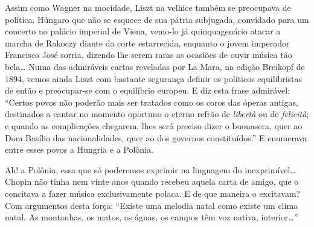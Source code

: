 Assim como Wagner na mocidade, Liszt na velhice também se preocupava de
política. Húngaro que não se esquece de sua pátria subjugada, convidado
para um concerto no palácio imperial de Viena, vemo-lo já quinquagenário
atacar a marcha de Rakoczy diante da corte estarrecida, enquanto o jovem
imperador Francisco José sorria, dizendo lhe serem raras as ocasiões de
ouvir música tão bela\ldots{} Numa das admiráveis cartas reveladas por La
Mara, na edição Breikopf de 1894, vemos ainda Liszt com bastante
segurança definir os políticos equilibristas de então e preocupar-se com
o equilíbrio europeu. E diz esta frase admirável: ``Certos povos não
poderão mais ser tratados como os coros das óperas antigas, destinados a
cantar no momento oportuno o eterno refrão de \textit{libertà} ou de \textit{felicità}; e
quando as complicações chegarem, lhes será preciso dizer o buonasera,
quer ao Dom Basílio das nacionalidades, quer ao dos governos
constituídos.'' E enumerava entre esses povos a Hungria e a Polônia.

Ah! a Polônia, essa que só poderemos exprimir na linguagem do
inexprimível\ldots{} Chopin não tinha nem vinte anos quando recebeu aquela
carta de amigo, que o concitava a fazer música exclusivamente polaca. E
de que maneira o excitavam? Com argumentos desta força: ``Existe uma
melodia natal como existe um clima natal. As montanhas, os matos, as
águas, os campos têm voz nativa, interior\ldots{}''

